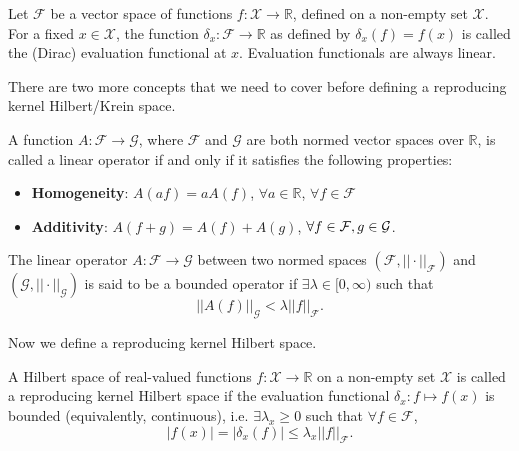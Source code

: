\documentclass[a4paper,showframe,11pt,draft]{report}
\begin{document}
\begin{definition}
	Let $\mathcal F$ be a vector space of functions $f:\mathcal X \rightarrow \mathbb R$, defined on a non-empty set $\mathcal X$. For a fixed $x \in \mathcal X$, the function $\delta_x:\mathcal F \rightarrow \mathbb R$ as defined by $\delta_x(f) = f(x)$ is called the (Dirac) evaluation functional at $x$. Evaluation functionals are always linear.
\end{definition}

There are two more concepts that we need to cover before defining a reproducing kernel Hilbert/Krein space.

\begin{definition}
	A function $A:\mathcal F \rightarrow \mathcal G$, where $\mathcal F$ and $\mathcal G$ are both normed vector spaces over $\mathbb R$, is called a linear operator if and only if it satisfies the following properties:
	\begin{itemize}
		\item \textbf{Homogeneity}: $A(af) = a A(f)$, $\forall a \in \mathbb R$, $\forall f \in \mathcal F$
		\item \textbf{Additivity}: $A(f+g) = A(f) + A(g)$, $\forall f \in \mathcal F, g \in {\mathcal G}$.
	\end{itemize}	
\end{definition}

\begin{definition}
	The linear operator $A:\mathcal F \rightarrow \mathcal G$ between two normed spaces $(\mathcal F, ||\cdot||_{\mathcal F})$ and $(\mathcal G, ||\cdot||_{\mathcal G})$ is said to be a bounded operator if $\exists \lambda \in [0,\infty)$ such that
	$$
	||A(f)||_{\mathcal G} < \lambda||f||_{\mathcal F}.
	$$
\end{definition}

Now we define a reproducing kernel Hilbert space.

\begin{definition}\label{def:rkhs}
	A Hilbert space of real-valued functions $f:\mathcal X \rightarrow \mathbb R$ on a non-empty set $\mathcal X$ is called a reproducing kernel Hilbert space if the evaluation functional $\delta_x: f \mapsto f(x)$ is bounded (equivalently, continuous\footnotemark), i.e. $\exists \lambda_x \geq 0$ such that $\forall f \in \mathcal F$,
	\[
		|f(x)| = |\delta_x(f)| \leq \lambda_x||f||_{\mathcal F}.
	\]
\end{definition}
\end{document}
